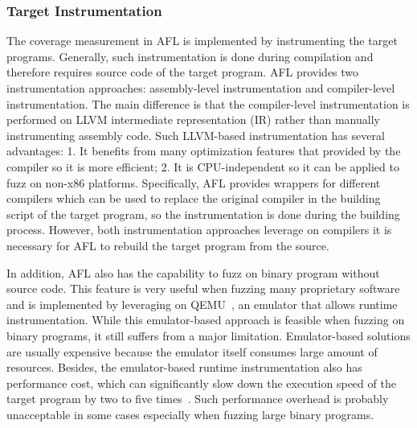 \subsubsection{\bf{Target Instrumentation}}

The coverage measurement in AFL is implemented by instrumenting the target programs. Generally, such instrumentation is done during compilation and therefore requires source code of the target program. AFL provides two instrumentation approaches: assembly-level instrumentation and compiler-level instrumentation. The main difference is that the compiler-level instrumentation is performed on LLVM intermediate representation (IR) rather than manually instrumenting assembly code.  Such LLVM-based instrumentation has several advantages: 1.  It  benefits from many optimization features that provided by the compiler so it is more efficient; 2. It is CPU-independent so it can be applied to fuzz on non-x86 platforms. Specifically, AFL provides wrappers for different compilers which can be used to replace the original compiler in the building script of the target program, so the instrumentation is done during the building process. However, both instrumentation approaches leverage on compilers it is necessary for AFL to rebuild the target program from the source.  

In addition, AFL also has the capability to fuzz on binary program without source code.  This feature is very useful when fuzzing many proprietary software and is implemented by leveraging on QEMU~\cite{qemu}, an emulator that allows runtime instrumentation. While this emulator-based approach is feasible when fuzzing on binary programs, it still suffers from a major limitation. Emulator-based solutions are usually expensive because the emulator itself consumes large amount of resources. Besides, the emulator-based runtime instrumentation also has performance cost, which can significantly slow down the execution speed of the target program by two to five times~\cite{aflreadme}. Such performance overhead is probably unacceptable in some cases especially when fuzzing large binary programs.





